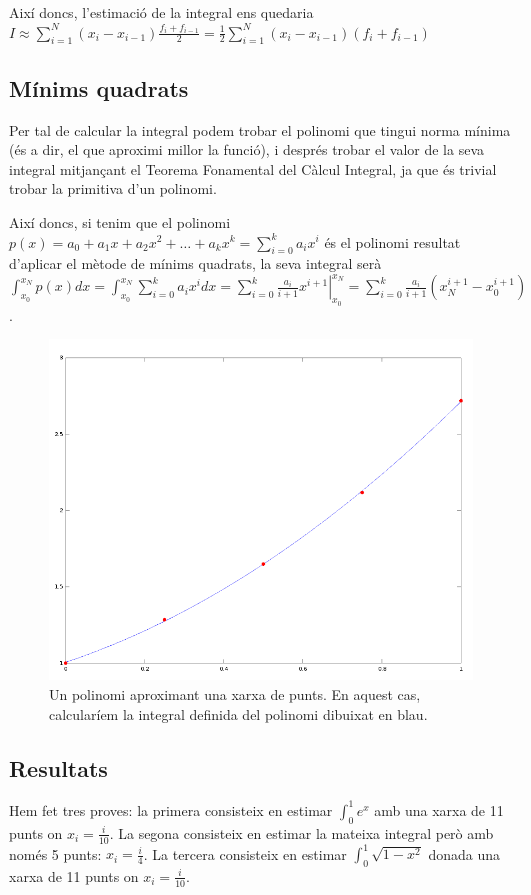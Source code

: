 \documentclass[11pt,a4paper]{article}
\begin{document}
Així doncs, l'estimació de la integral ens quedaria $I \approx \sum_{i=1}^N (x_i - x_{i-1})\frac{f_i + f_{i-1}}{2} = \frac{1}{2}\sum_{i=1}^N (x_i - x_{i-1})(f_i + f_{i-1})$

\subsection{Mínims quadrats}

Per tal de calcular la integral podem trobar el polinomi que tingui norma mínima (és a dir, el que aproximi millor la funció), i després trobar el valor de la seva integral mitjançant el Teorema Fonamental del Càlcul Integral, ja que és trivial trobar la primitiva d'un polinomi.

Així doncs, si tenim que el polinomi $p(x) = a_0 + a_1 x + a_2 x^2 + \ldots + a_k x^k = \sum_{i=0}^k a_i x^i$ és el polinomi resultat d'aplicar el mètode de mínims quadrats, la seva integral serà $\int_{x_0}^{x_N}p(x)dx = \int_{x_0}^{x_N}\sum_{i=0}^k a_i x^i dx = \left.\sum_{i=0}^k \frac{a_i}{i+1}x^{i+1} \right\rvert_{x_0}^{x_N} = \sum_{i=0}^k \frac{a_i}{i+1}(x_N^{i+1} - x_0^{i+1})$.

\begin{figure}[h]
\centering
\includegraphics[scale=0.35]{polminquad}
\caption{Un polinomi aproximant una xarxa de punts. En aquest cas, calcularíem la integral definida del polinomi dibuixat en blau.}
\end{figure}

\subsection{Resultats}
Hem fet tres proves: la primera consisteix en estimar $\int_0^1 e^x$ amb una xarxa de 11 punts on $x_i = \frac{i}{10}$. La segona consisteix en estimar la mateixa integral però amb només 5 punts: $x_i = \frac{i}{4}$. La tercera consisteix en estimar $\int_0^1 \sqrt{1-x^2}$ donada una xarxa de 11 punts on $x_i = \frac{i}{10}$.
\end{document}
